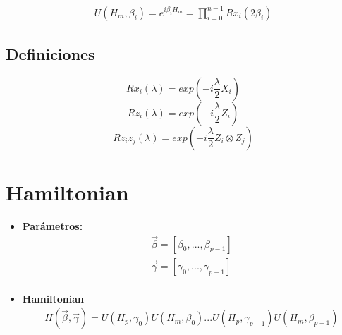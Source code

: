\documentclass{article}
\begin{document}
\begin{align*}
  U(H_m, \beta_i) = e^{i \beta_i H_m} = \prod_{i=0}^{n-1}Rx_i(2\beta_i)
\end{align*}

\subsection{Definiciones}
\begin{equation*}
  Rx_i(\lambda) = exp(-i\frac{\lambda}{2}X_i)
\end{equation*}
\begin{equation*}
  Rz_i(\lambda) = exp(-i\frac{\lambda}{2}Z_i)
\end{equation*}
\begin{equation*}
  Rz_iz_j(\lambda) = exp(-i\frac{\lambda}{2}Z_i \otimes Z_j)
\end{equation*}

\section{Hamiltonian}
\begin{itemize}
\item \textbf{Parámetros:}
  \begin{align*}
    \vec{\beta} = [\beta_0, ..., \beta_{p-1}]\\
    \vec{\gamma} = [\gamma_0, ..., \gamma_{p-1}]\\
  \end{align*}

\item \textbf{Hamiltonian}
  \begin{align*}
    H(\vec{\beta}, \vec{\gamma}) = U(H_p, \gamma_0)U(H_m, \beta_0) ... U(H_p, \gamma_{p-1})U(H_m, \beta_{p-1})
  \end{align*}

\end{itemize}
\end{document}
